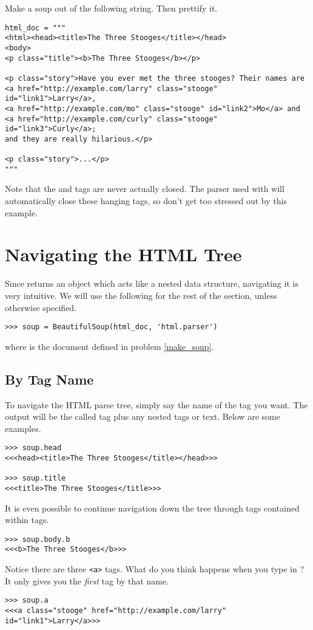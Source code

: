 \begin{problem}\label{make_soup}
Make a soup out of the following string. Then prettify it.
\begin{lstlisting}
html_doc = """
<html><head><title>The Three Stooges</title></head>
<body>
<p class="title"><b>The Three Stooges</b></p>

<p class="story">Have you ever met the three stooges? Their names are
<a href="http://example.com/larry" class="stooge" id="link1">Larry</a>,
<a href="http://example.com/mo" class="stooge" id="link2">Mo</a> and
<a href="http://example.com/curly" class="stooge" id="link3">Curly</a>;
and they are really hilarious.</p>

<p class="story">...</p>
"""
\end{lstlisting}

\begin{info}
Note that the  and  tags are never actually closed.
The parser used with  will automatically close these hanging tags, so don't get too stressed out by this example.
\end{info}

\end{problem}

\section*{Navigating the HTML Tree}

Since  returns an object which acts like a nested data structure, navigating it is very intuitive.
We will use the following for the rest of the section, unless otherwise specified.
\begin{lstlisting}
>>> soup = BeautifulSoup(html_doc, 'html.parser')
\end{lstlisting}
where  is the document defined in problem \ref{make_soup}.

\subsection*{By Tag Name}

To navigate the HTML parse tree, simply say the name of the tag you want.
The output will be the called tag plus any nested tags or text.
Below are some examples.
\begin{lstlisting}
>>> soup.head
<<<head><title>The Three Stooges</title></head>>>

>>> soup.title
<<<title>The Three Stooges</title>>>
\end{lstlisting}
It is even possible to continue navigation down the tree through tags contained within tags.
\begin{lstlisting}
>>> soup.body.b
<<<b>The Three Stooges</b>>>
\end{lstlisting}
Notice there are three \lstinline{<a>} tags.
What do you think happens when you type in ?
It only gives you the \textit{first} tag by that name.
\begin{lstlisting}
>>> soup.a
<<<a class="stooge" href="http://example.com/larry" id="link1">Larry</a>>>
\end{lstlisting}

